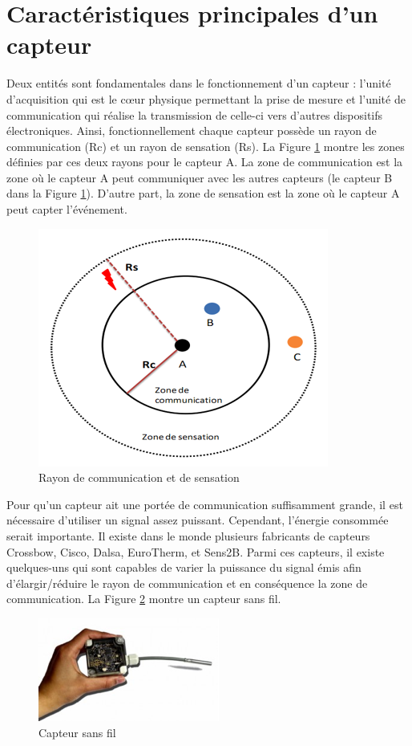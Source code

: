 \section{Caractéristiques principales d’un capteur}
Deux entités sont fondamentales dans le fonctionnement d’un capteur : l’unité d’acquisition qui est le cœur physique permettant la prise de mesure et l’unité de communication qui réalise la transmission de celle-ci  vers d’autres dispositifs électroniques. Ainsi, fonctionnellement chaque capteur  possède un rayon de communication (Rc) et un rayon de sensation (Rs).  La  Figure \ref{percept} montre les zones définies par ces deux rayons pour le capteur A. La zone de communication est la zone où le capteur A peut communiquer avec les autres capteurs (le capteur B dans la Figure \ref{percept}). D’autre part, la zone de sensation est la zone où le capteur A peut capter l’événement.

\begin{figure}[h]
\centering
\includegraphics[scale=0.8]{intro/percept}
\caption{\label{percept} Rayon de communication et de sensation}
\end{figure}

Pour qu’un capteur ait une portée de communication suffisamment grande, il est nécessaire d’utiliser un signal  assez puissant. Cependant, l’énergie consommée serait importante. Il existe dans le monde plusieurs fabricants de capteurs Crossbow, Cisco, Dalsa, EuroTherm, et Sens2B. Parmi ces capteurs, il existe quelques-uns qui sont capables de varier la puissance du signal émis afin d’élargir/réduire le rayon de communication et en conséquence la zone de communication. La  Figure \ref{imageCapteur}  montre un capteur sans fil.

\begin{figure}[h]
\centering
\includegraphics[scale=0.8]{intro/imageCapteur}
\caption{\label{imageCapteur} Capteur sans fil}
\end{figure}


